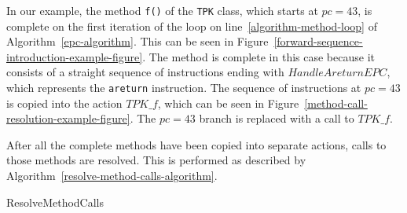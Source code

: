 In our example, the method \texttt{f()} of the \texttt{TPK} class,
which starts at $pc = 43$, is complete on the first iteration of the
loop on line~\ref{algorithm-method-loop} of
Algorithm~\ref{epc-algorithm}.
This can be seen in
Figure~\ref{forward-sequence-introduction-example-figure}.
The method is complete in this case because it consists of a straight
sequence of instructions ending with $HandleAreturnEPC$, which
represents the \texttt{areturn} instruction.
The sequence of instructions at $pc = 43$ is copied into the action $TPK\_f$,
which can be seen in
Figure~\ref{method-call-resolution-example-figure}.
The $pc = 43$ branch is replaced with a call to $TPK\_f$.

After all the complete methods have been copied into separate actions,
calls to those methods are resolved.
This is performed as described by
Algorithm~\ref{resolve-method-calls-algorithm}.
\begin{algorithm}
  \begin{algorithmic}[1]
    \State {}
    \Try
    \State {}
    \State {}
    \EndTry
    \EndFor
    \State {}
    \Else
    \Try
    \State {}
    \State {}
    \State {}
    \EndTry
    \Try
    \State {}
    \State {}
    \EndTry
    \EndIf
    \label{algorithm-lci-sequence-check}
    \State {}
    \label{algorithm-lci-sequence-introduction}
    \EndIf
    \EndFor
    \EndFor
  \end{algorithmic}
  \caption{ResolveMethodCalls}
  \label{resolve-method-calls-algorithm}
\end{algorithm}

